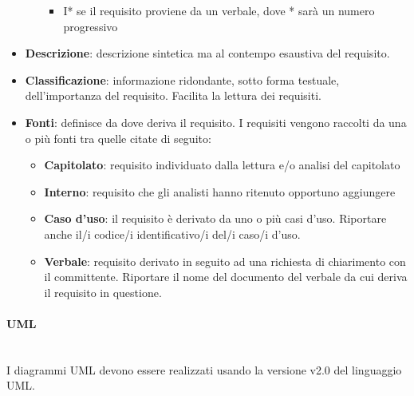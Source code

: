\begin{itemize}
\begin{itemize}
\begin{itemize}
			\item I* se il requisito proviene da un verbale, dove * sarà un numero progressivo
		\end{itemize}
\end{itemize}
	\item \textbf{Descrizione}: descrizione sintetica ma al contempo esaustiva del requisito.
	\item \textbf{Classificazione}: informazione ridondante, sotto forma testuale, dell’importanza del requisito. Facilita la lettura dei requisiti.
	\item \textbf{Fonti}: definisce da dove deriva il requisito. I requisiti vengono raccolti da una o più fonti tra quelle citate di seguito:
	\begin{itemize}
		\item \textbf{Capitolato}: requisito individuato dalla lettura e/o analisi del capitolato
		\item \textbf{Interno}: requisito che gli analisti hanno ritenuto opportuno aggiungere
		\item \textbf{Caso d’uso}: il requisito è derivato da uno o più casi d’uso. Riportare anche il/i codice/i identificativo/i del/i caso/i d’uso.
		\item \textbf{Verbale}: requisito derivato in seguito ad una richiesta di chiarimento con il committente. Riportare il nome del documento del verbale da cui deriva il requisito in questione.		
	\end{itemize}
\end{itemize}
\paragraph{UML}\mbox{}\\
I diagrammi UML devono essere realizzati usando la versione v2.0 del linguaggio UML.



